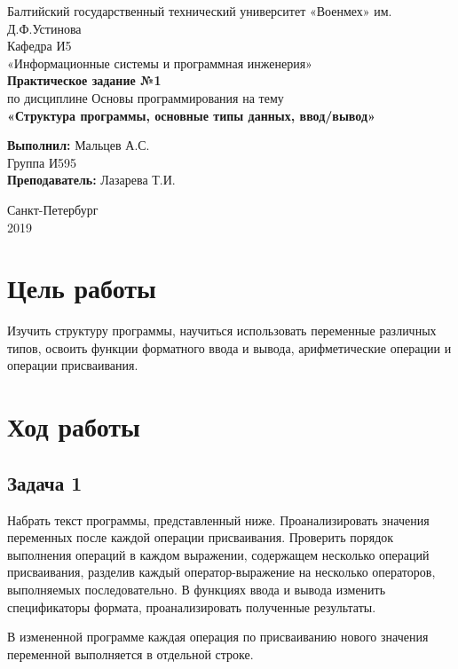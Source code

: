\documentclass[a4paper,14pt]{extarticle}
\begin{document}
\begin{titlepage}
\centering
\small Балтийский государственный технический университет «Военмех» им. Д.Ф.Устинова \\
\vspace{3cm}
\normalsize Кафедра И5\\
«Информационные системы и программная инженерия»\\
\vspace{3cm}
\textbf{Практическое задание №1}\\
по дисциплине Основы программирования на тему\\ 
\textbf{«Структура программы, основные типы данных, ввод/вывод»}\\
\vfill

\begin{flushleft}
\textbf{Выполнил:}
\hfill {Мальцев А.С.} \\
\hfill {Группа И595} \\
\vspace{1cm}
\textbf{Преподаватель:}
\hfill {Лазарева Т.И.} \\
\end{flushleft}
\vspace{3cm}

{\centering Санкт-Петербург \\ 
\vspace{0.15cm}
2019}
\end{titlepage}

\section{Цель работы}
Изучить структуру программы, научиться использовать переменные различных типов, освоить функции форматного ввода и вывода, арифметические операции и операции присваивания.

\section{Ход работы}
\subsection{Задача 1} 
Набрать текст программы, представленный ниже. Проанализировать значения переменных после каждой операции присваивания. Проверить порядок выполнения операций в каждом выражении, содержащем несколько операций присваивания, разделив каждый оператор-выражение на несколько операторов, выполняемых последовательно. В функциях ввода и вывода изменить спецификаторы формата, проанализировать полученные результаты.


В измененной программе каждая операция по присваиванию нового значения переменной выполняется в отдельной строке.
\end{document}
